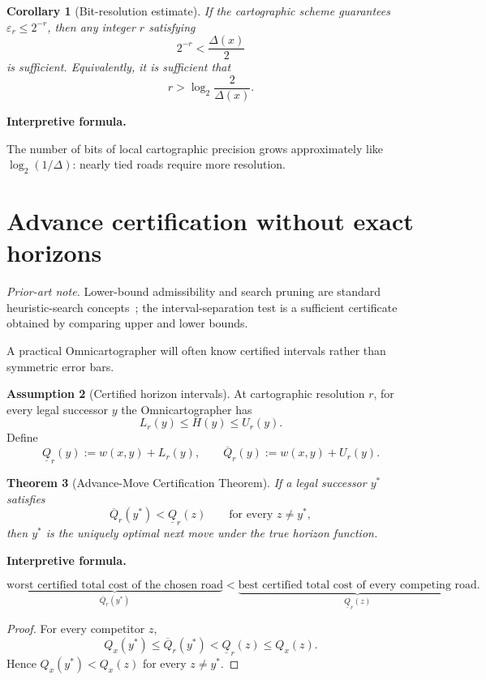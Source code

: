 \documentclass[11pt]{article}
\newtheorem{theorem}{Theorem}[section]
\newtheorem{corollary}[theorem]{Corollary}
\theoremstyle{definition}
\newtheorem{assumption}[theorem]{Assumption}
\theoremstyle{remark}
\newcommand{\Qval}{Q}
\newcommand{\Gap}{\Delta}
\newcommand{\eps}{\varepsilon}
\newenvironment{interpretiveformula}{%
  \begin{center}\begin{minipage}{0.92\linewidth}\small
  \textbf{Interpretive formula.}\ \raggedright}{\end{minipage}\end{center}}
\begin{document}
\begin{corollary}[Bit-resolution estimate]
If the cartographic scheme guarantees $\eps_r\le 2^{-r}$, then any integer $r$ satisfying
\[
2^{-r}<\frac{\Gap(x)}{2}
\]
is sufficient. Equivalently, it is sufficient that
\[
r>\log_2\frac{2}{\Gap(x)}.
\]
\end{corollary}

\begin{interpretiveformula}
The number of bits of local cartographic precision grows approximately like $\log_2(1/\Gap)$: nearly tied roads require more resolution.
\end{interpretiveformula}

\section{Advance certification without exact horizons}
\noindent\textit{Prior-art note.} Lower-bound admissibility and search pruning are standard heuristic-search concepts~\cite{astar,pearl}; the interval-separation test is a sufficient certificate obtained by comparing upper and lower bounds.

A practical Omnicartographer will often know certified intervals rather than symmetric error bars.

\begin{assumption}[Certified horizon intervals]
At cartographic resolution $r$, for every legal successor $y$ the Omnicartographer has
\[
L_r(y)\le H(y)\le U_r(y).
\]
Define
\[
\underline{\Qval}_r(y):=w(x,y)+L_r(y),\qquad
\overline{\Qval}_r(y):=w(x,y)+U_r(y).
\]
\end{assumption}

\begin{theorem}[Advance-Move Certification Theorem]\label{thm:advance}
If a legal successor $y^*$ satisfies
\[
\boxed{
\overline{\Qval}_r(y^*)<\underline{\Qval}_r(z)
\qquad\text{for every }z\neq y^*,
}
\]
then $y^*$ is the uniquely optimal next move under the true horizon function.
\end{theorem}

\begin{interpretiveformula}
\[
\underbrace{\text{worst certified total cost of the chosen road}}_{\overline{\Qval}_r(y^*)}
<
\underbrace{\text{best certified total cost of every competing road}}_{\underline{\Qval}_r(z)}.
\]
\end{interpretiveformula}

\begin{proof}
For every competitor $z$,
\[
\Qval_x(y^*)\le\overline{\Qval}_r(y^*)<\underline{\Qval}_r(z)\le\Qval_x(z).
\]
Hence $\Qval_x(y^*)<\Qval_x(z)$ for every $z\neq y^*$.
\end{proof}
\end{document}
